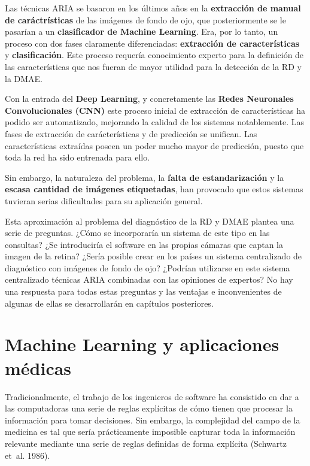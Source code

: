\documentclass[
  12pt,
  spanish,
  a4paperpaper,
]{report}
\begin{document}
Las técnicas ARIA se basaron en los últimos años en la
\textbf{extracción de manual de caráctrísticas} de las imágenes de fondo
de ojo, que posteriormente se le pasarían a un \textbf{clasificador de
Machine Learning}. Era, por lo tanto, un proceso con dos fases
claramente diferenciadas: \textbf{extracción de características} y
\textbf{clasificación}. Este proceso requería conocimiento experto para
la definición de las características que nos fueran de mayor utilidad
para la detección de la RD y la DMAE.

Con la entrada del \textbf{Deep Learning}, y concretamente las
\textbf{Redes Neuronales Convolucionales (CNN)} este proceso inicial de
extracción de características ha podido ser automatizado, mejorando la
calidad de los sistemas notablemente. Las fases de extracción de
carácterísticas y de predicción se unifican. Las características
extraídas poseen un poder mucho mayor de predicción, puesto que toda la
red ha sido entrenada para ello.

Sin embargo, la naturaleza del problema, la \textbf{falta de
estandarización} y la \textbf{escasa cantidad de imágenes etiquetadas},
han provocado que estos sistemas tuvieran serias dificultades para su
aplicación general.

Esta aproximación al problema del diagnóstico de la RD y DMAE plantea
una serie de preguntas. ¿Cómo se incorporaría un sistema de este tipo en
las consultas? ¿Se introduciría el software en las propias cámaras que
captan la imagen de la retina? ¿Sería posible crear en los países un
sistema centralizado de diagnóstico con imágenes de fondo de ojo?
¿Podrían utilizarse en este sistema centralizado técnicas ARIA
combinadas con las opiniones de expertos? No hay una respuesta para
todas estas preguntas y las ventajas e inconvenientes de algunas de
ellas se desarrollarán en capítulos posteriores.

\hypertarget{ml}{%
\chapter{Machine Learning y aplicaciones médicas}\label{ml}}

Tradicionalmente, el trabajo de los ingenieros de software ha consistido
en dar a las computadoras una serie de reglas explícitas de cómo tienen
que procesar la información para tomar decisiones. Sin embargo, la
complejidad del campo de la medicina es tal que sería prácticamente
imposible capturar toda la información relevante mediante una serie de
reglas definidas de forma explícita (Schwartz et~al. 1986).
\end{document}
